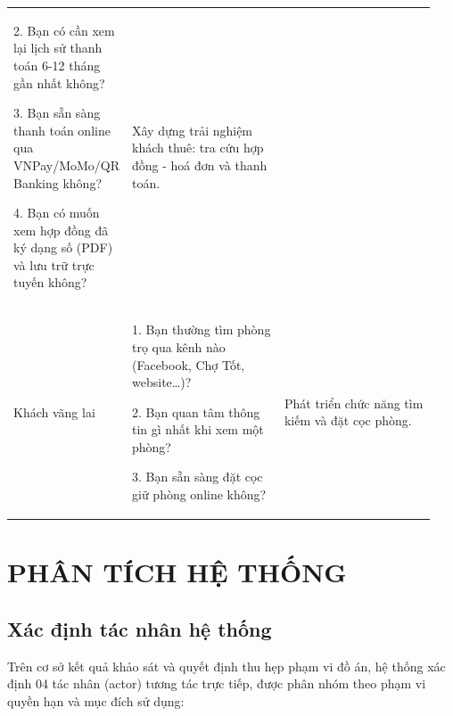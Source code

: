 \documentclass[a4paper,oneside]{report}
\begin{document}
\begin{longtable}[]{@{}>{\RaggedRight\arraybackslash}p{0.20\linewidth}>{\RaggedRight\arraybackslash}p{0.37\linewidth}>{\RaggedRight\arraybackslash}p{0.37\linewidth}@{}}
\begin{minipage}[t]{\linewidth}
2. Bạn có cần xem lại lịch sử thanh toán 6-12 tháng gần nhất không?

3. Bạn sẵn sàng thanh toán online qua VNPay/MoMo/QR Banking không?

4. Bạn có muốn xem hợp đồng đã ký dạng số (PDF) và lưu trữ trực tuyến
không?\strut
\end{minipage} & \begin{minipage}[t]{\linewidth}\raggedright
Xây dựng trải nghiệm khách thuê: tra cứu hợp đồng - hoá đơn và thanh
toán.\strut
\end{minipage}\tabularnewline
\begin{minipage}[t]{\linewidth}\raggedright
Khách vãng lai\strut
\end{minipage} & \begin{minipage}[t]{\linewidth}\raggedright
1. Bạn thường tìm phòng trọ qua kênh nào (Facebook, Chợ Tốt,
website\ldots)?

2. Bạn quan tâm thông tin gì nhất khi xem một phòng?

3. Bạn sẵn sàng đặt cọc giữ phòng online không?\strut
\end{minipage} & \begin{minipage}[t]{\linewidth}\raggedright
Phát triển chức năng tìm kiếm và đặt cọc phòng.\strut
\end{minipage}\tabularnewline
\bottomrule
\end{longtable}


\chapter{PHÂN TÍCH HỆ THỐNG}

\section{Xác định tác nhân hệ thống}

Trên cơ sở kết quả khảo sát và quyết định thu hẹp phạm vi đồ án, hệ
thống xác định 04 tác nhân (actor) tương tác trực tiếp, được phân nhóm
theo phạm vi quyền hạn và mục đích sử dụng:
\end{document}
